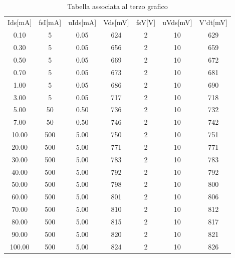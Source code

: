 \documentclass{article}
\begin{document}
~
\begin{table}[]
  \begin{center}
   \begin{tabular}{|c|c|c|c|c|c|c|}
      Ids[mA]&fsI[mA]&uIds[mA]&Vds[mV]&fsV[V]&uVds[mV]&V'dt[mV] \\
      0.10&5&0.05&624&2&10&629\\
      0.30&5&0.05&656&2&10&659\\
      0.50&5&0.05&669&2&10&672\\
      0.70&5&0.05&673&2&10&681\\
      1.00&5&0.05&686&2&10&690\\
      3.00&5&0.05&717&2&10&718\\
      5.00&50&0.50&736&2&10&732\\
      7.00&50&0.50&746&2&10&742\\
      10.00&500&5.00&750&2&10&751\\
      20.00&500&5.00&771&2&10&771\\
      30.00&500&5.00&783&2&10&783\\
      40.00&500&5.00&792&2&10&792\\
      50.00&500&5.00&798&2&10&800\\
      60.00&500&5.00&801&2&10&806\\
      70.00&500&5.00&810&2&10&812\\
      80.00&500&5.00&815&2&10&817\\
      90.00&500&5.00&820&2&10&821\\
      100.00&500&5.00&824&2&10&826
       \end{tabular}
  \caption{Tabella associata al terzo grafico}
  \end{center}
\end{table} 
\end{document}

